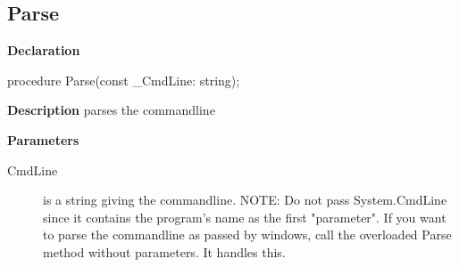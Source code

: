 \documentclass{report}
\newif\ifpdf
\begin{document}
\subsection*{Parse}
\fi
\label{ok_helpinsight_comments-Parse}
\begin{list}{}{
\setlength{\itemindent}{0cm}
\setlength{\listparindent}{0cm}
\setlength{\leftmargin}{\evensidemargin}
\addtolength{\leftmargin}{\tmplength}
\settowidth{\labelsep}{X}
\addtolength{\leftmargin}{\labelsep}
\setlength{\labelwidth}{\tmplength}
}
\item[\textbf{Declaration}\hfill]
\ifpdf
\begin{flushleft}
\fi
\begin{ttfamily}
procedure Parse(const {\_}CmdLine: string);\end{ttfamily}

\ifpdf
\end{flushleft}
\fi

\par
\item[\textbf{Description}]
parses the commandline\hfill\vspace*{1ex}

 \par
\item[\textbf{Parameters}]
\begin{description}
\item[CmdLine] is a string giving the commandline. NOTE: Do not pass System.CmdLine since it contains the program's name as the first "parameter". If you want to parse the commandline as passed by windows, call the overloaded Parse method without parameters. It handles this.
\end{description}


\end{list}
\end{document}
